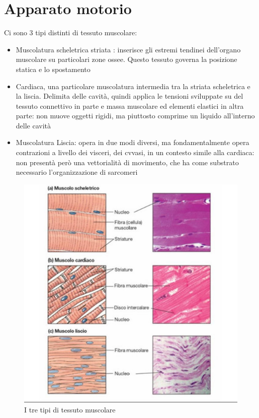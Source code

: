 \documentclass[a4paper,12pt]{article}
\begin{document}
\section{Apparato motorio}
Ci sono 3 tipi distinti di tessuto muscolare: 
\begin{itemize}
    \item{Muscolatura scheletrica striata : inserisce gli estremi tendinei dell'organo muscolare su particolari zone ossee. Questo tessuto governa la posizione statica e lo spostamento}
    \item{Cardiaca, una particolare muscolatura intermedia tra la striata scheletrica e la liscia. Delimita delle cavità, quindi applica le tensioni sviluppate su del tessuto connettivo in parte e massa muscolare ed elementi elastici in altra parte: non muove oggetti rigidi, ma piuttosto comprime un liquido all'interno delle cavità}
    \item{Muscolatura Liscia: opera in due modi diversi, ma fondamentalmente opera contrazioni a livello dei visceri, dei cvvasi, in un contesto simile alla cardiaca: non presentà però una vettorialità di movimento, che ha come substrato necessario l'organizzazione di sarcomeri}
    \end{itemize}


\begin{figure}[H]
\centering
\includegraphics[scale=0.4]{immagine/muscoli.jpg}
\caption{I tre tipi di tessuto muscolare}
\end{figure}
    
\end{document}
